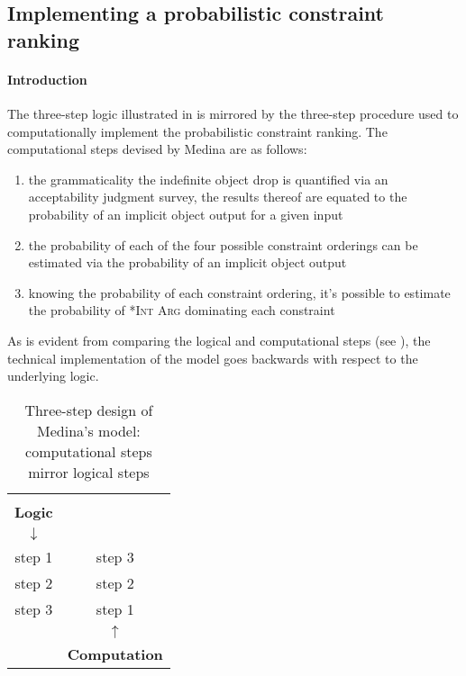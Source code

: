 \subsection{Implementing a probabilistic constraint ranking} 

\paragraph{Introduction} The three-step logic illustrated in  is mirrored by the three-step procedure used to computationally implement the probabilistic constraint ranking. The computational steps devised by Medina are as follows:

\begin{enumerate}
    \item the grammaticality the indefinite object drop is quantified via an acceptability judgment survey, the results thereof are equated to the probability of an implicit object output for a given input
    \item the probability of each of the four possible constraint orderings can be estimated via the probability of an implicit object output
    \item knowing the probability of each constraint ordering, it's possible to estimate the probability of \textsc{*Int Arg} dominating each constraint
\end{enumerate}

As is evident from comparing the logical and computational steps (see ), the technical implementation of the model goes backwards with respect to the underlying logic.

\begin{table}[htb] %
\caption{Three-step design of Medina's model: computational steps mirror logical steps}
\begin{tabular}{c c}
 & \\
\cmidrule{1-1} %
\textbf{Logic} &                      \\
\textbf{$\downarrow$} &                      \\ \hline
step 1         & step 3               \\
step 2         & step 2               \\
step 3         & step 1               \\ \hline
               & \textbf{$\uparrow$} \\
               & \textbf{Computation} \\
\cmidrule{2-2}           
\end{tabular}
\end{table}

